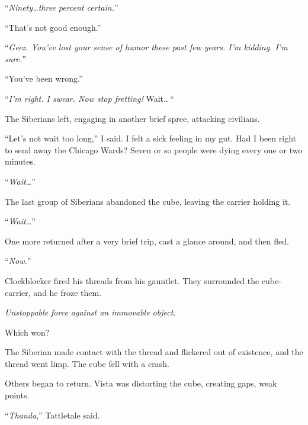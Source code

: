``\emph{Ninety\ldots three percent certain.}''



``That's not good enough.''



``\emph{Geez.  You've lost your sense of humor these past few years.  I'm kidding.  I'm sure.}''



``You've been wrong.''



``\emph{I'm right.  I swear.  Now stop fretting!}  Wait\ldots\emph{``}



The Siberians left, engaging in another brief spree, attacking civilians.



``Let's not wait too long,'' I said.  I felt a sick feeling in my gut.  Had I been right to send away the Chicago Wards?  Seven or so people were dying every one or two minutes.



``\emph{Wait\ldots}''



The last group of Siberians abandoned the cube, leaving the carrier holding it.



``\emph{Wait\ldots}''



One more returned after a very brief trip, cast a glance around, and then fled.



``\emph{Now.}''



Clockblocker fired his threads from his gauntlet.  They surrounded the cube-carrier, and he froze them.



\emph{Unstoppable force against an immovable object}.



Which won?



The Siberian made contact with the thread and flickered out of existence, and the thread went limp.  The cube fell with a crash.



Others began to return.  Vista was distorting the cube, creating gaps, weak points.



``\emph{Thanda},'' Tattletale said.



